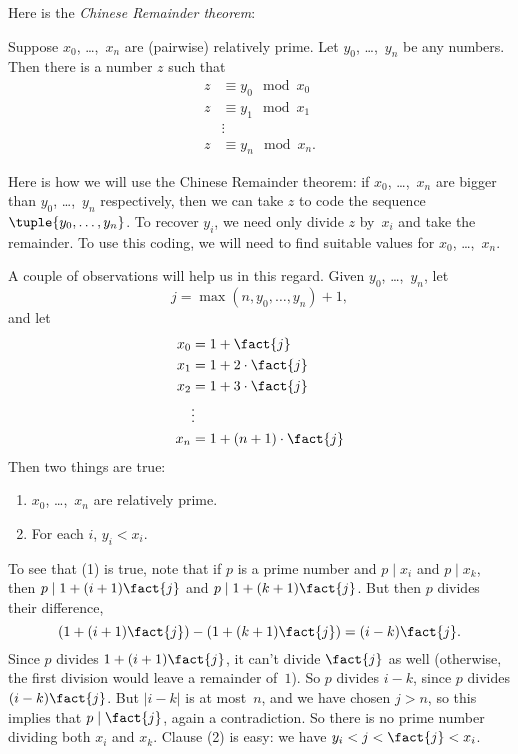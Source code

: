 \documentclass[../../../include/open-logic-section]{subfiles}
\begin{document}
Here is the \emph{Chinese Remainder theorem}:
\begin{thm}
Suppose $x_0$, \dots,~$x_n$ are (pairwise) relatively prime. Let
$y_0$, \dots,~$y_n$ be any numbers. Then there is a number $z$ such that
\begin{align*}
z & \equiv y_0 \mod x_0 \\
z & \equiv y_1 \mod x_1 \\
& \vdots  \\
z & \equiv y_n \mod x_n.
\end{align*}
\end{thm}

Here is how we will use the Chinese Remainder theorem: if $x_0$,
\dots,~$x_n$ are bigger than $y_0$, \dots,~$y_n$ respectively, then we
can take $z$ to code the sequence $\tuple{y_0, \dots,y_n}$. To recover
$y_i$, we need only divide $z$ by~$x_i$ and take the remainder. To use
this coding, we will need to find suitable values for $x_0$,
\dots,~$x_n$.

A couple of observations will help us in this regard. Given
$y_0$, \dots,~$y_n$, let
\[
j = \max(n, y_0, \dots, y_n) + 1,
\]
and let
\begin{align*}
x_0 & = 1 + \fact{j} \\
x_1 & = 1 + 2 \cdot \fact{j} \\
x_2 & = 1 + 3 \cdot \fact{j} \\
& \vdots  \\
x_n & = 1 + (n+1) \cdot \fact{j}
\end{align*}
Then two things are true:
\begin{enumerate}
\item $x_0$, \dots,~$x_n$ are relatively prime.
\item For each $i$, $y_i < x_i$.
\end{enumerate}
To see that (1) is true, note that if $p$ is a prime number and $p
\mid x_i$ and $p \mid x_k$, then $p \mid 1 + (i+1) \fact{j}$ and $p \mid
1 + (k+1) \fact{j}$. But then $p$ divides their difference,
\[
(1 + (i+1)\fact{j}) - (1+ (k+1)\fact{j}) = (i-k) \fact{j}.
\]
Since $p$ divides $1 + (i+1)\fact{j}$, it can't divide $\fact{j}$ as well
(otherwise, the first division would leave a remainder of~$1$). So $p$
divides $i-k$, since $p$ divides $(i-k)\fact{j}$. But $\left| i-k
\right|$ is at most~$n$, and we have chosen $j > n$, so this implies
that $p \mid \fact{j}$, again a contradiction. So there is no prime
number dividing both $x_i$ and $x_k$. Clause (2) is easy: we have $y_i <
j < \fact{j} < x_i$.
\end{document}
